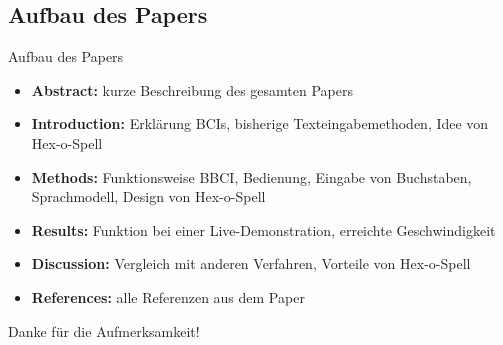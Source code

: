 \documentclass{beamer}
\begin{document}
    \subsection{Aufbau des Papers}
    \begin{frame}[<+->]{Aufbau des Papers}
      \begin{block}{}
        \begin{itemize}
          \item \textbf{Abstract:}
            kurze Beschreibung des gesamten Papers
          
          \item \textbf{Introduction:} 
            Erklärung BCIs, bisherige Texteingabemethoden, Idee von Hex-o-Spell
            
          \item \textbf{Methods:}
            Funktionsweise BBCI, Bedienung, Eingabe von Buchstaben, Sprachmodell, Design von Hex-o-Spell
            
          \item \textbf{Results:}
            Funktion bei einer Live-Demonstration, erreichte Geschwindigkeit
            
          \item \textbf{Discussion:}
            Vergleich mit anderen Verfahren, Vorteile von Hex-o-Spell
            
          \item \textbf{References:}
            alle Referenzen aus dem Paper
        \end{itemize}
      \end{block}
    \end{frame}
  
				
		\begin{frame}
			\begin{center}
				\begin{large}
					Danke für die Aufmerksamkeit!
				\end{large}
			\end{center}
		\end{frame}
\end{document}
